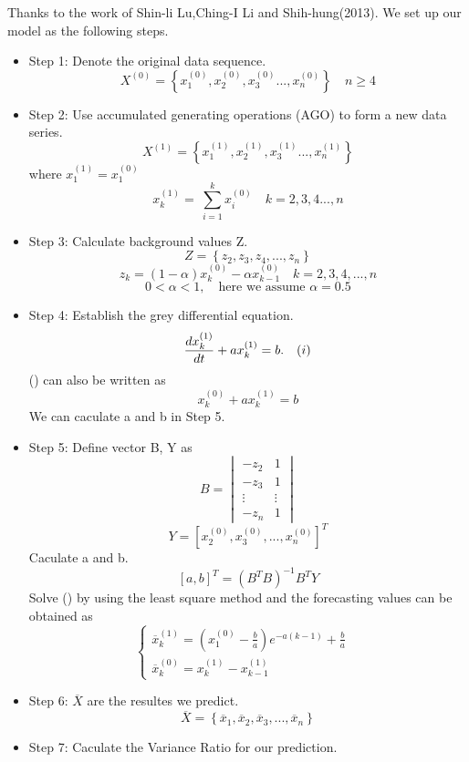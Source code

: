 \documentclass{mcmthesis}
\begin{document}
Thanks to the work of Shin-li Lu,Ching-I Li and Shih-hung(2013)\cite{GM}. We set up our model as the following steps.
	\begin{itemize}
		\item Step 1: Denote the original data sequence.
		$$
			X^{(0)} = \left\{x^{(0)}_1, x^{(0)}_2, x^{(0)}_3..., x^{(0)}_n\right\} \quad n \ge 4
		$$
		\item Step 2: Use accumulated generating operations (AGO) to form a new data series.
		$$
			X^{(1)} = \left\{x^{(1)}_1, x^{(1)}_2, x^{(1)}_3..., x^{(1)}_n\right\} 
		$$
		where $x^{(1)}_1=x^{(0)}_1$
		$$
			x^{(1)}_k = \ \sum_{i=1}^k x^{(0)}_i \quad k=2,3,4...,n
		$$
		\item Step 3: Calculate background values Z.
		$$
			Z = \left\{z_2,z_3,z_4,...,z_n\right\}
		$$
		$$
			z_k = (1-\alpha)x^{(0)}_{k} - \alpha x^{(0)}_{k-1} \quad k=2,3,4,...,n 
		$$
		$$
		 0<\alpha <1,\quad \mbox{here\ we\ assume\ } \alpha = 0.5
		$$
		\item Step 4: Establish the grey differential equation.
		$$
			\frac {dx^{(1)}_k}{dt} +  ax^{(1)}_k = b.\quad (\uppercase\expandafter{\romannumeral1})
		$$
		 (\uppercase\expandafter{}) can also be written as 
		 $$
		 	x^{(0)}_k + ax^{(1)}_k = b
		 $$
		 We can caculate a and b in Step 5.
		\item Step 5:
		Define vector B, Y as
		$$
			B = 
			\begin{vmatrix}
			-z_2 & 1\\
			-z_3 & 1\\
			\vdots & \vdots\\
			-z_n & 1
			\end{vmatrix}
		$$
		$$
		Y = [x^{(0)}_2,x^{(0)}_3,...,x^{(0)}_n]^T
		$$
		Caculate a and b.
		$$
			[a,b]^T = (B^TB)^{-1}B^TY
		$$
		 Solve (\uppercase\expandafter{}) by using the least square method and the forecasting values can be obtained as
		$$
			\left\{  
             \begin{array}{lr}  
             \overline x^{(1)}_k = \left(x^{(0)}_1 - \frac{b}{a}\right)e^{-a(k-1)} + \frac{b}{a} &\\
             \overline x^{(0)}_k = x^{(1)}_k - x^{(1)}_{k-1}
             \end{array}  
			\right.  
		$$
		\item Step 6: $\overline X$ are the resultes we predict.
		$$
		\overline X = \left\{\overline x_1,\overline x_2,\overline x_3,...,\overline x_n \right\}
		$$
		\item Step 7: Caculate the Variance Ratio for our prediction.\\

\end{itemize}
\end{document}
